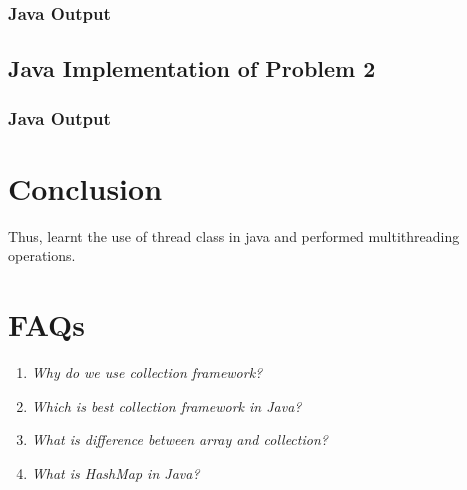\documentclass[11pt]{article}
\begin{document}


\subsubsection{Java Output}


\subsection{Java Implementation of Problem 2}



\subsubsection{Java Output}



\section{Conclusion}
Thus, learnt the use of thread class in java and performed multithreading operations.

\pagebreak

\section{FAQs}

\begin{enumerate}
	\item \textit{Why do we use collection framework?}
	
	\item \textit{Which is best collection framework in Java?}
	
	\item \textit{What is difference between array and collection?}
	
	\item \textit{What is HashMap in Java?}
	
\end{enumerate}
\end{document}
